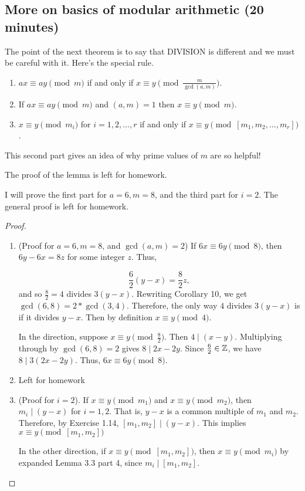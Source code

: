 \documentclass[letterpaper, 11 pt]{article}
\begin{document}
\subsection{More on basics of modular arithmetic (20 minutes)}
The point of the next theorem is to say that DIVISION is different and we must be careful with it. Here's the special rule.

\begin{thm}
\begin{enumerate}
\item $ax\equiv ay \pmod{m}$ if and only if $x\equiv y \pmod{\frac{m}{\gcd(a,m)}}$.
\item If $ax \equiv ay \pmod{m}$ and $(a,m)=1$ then $x\equiv y \pmod{m}$.
\item $x\equiv y \pmod{m_i}$ for $i=1,2,\dots, r$ if and only if $x\equiv y \pmod{[m_1,m_2,\dots,m_r]}$.
\end{enumerate}
\end{thm}

This second part gives an idea of why prime values of $m$ are so helpful!


The proof of the lemma is left for homework.

I will prove the first part for $a=6, m=8$, and the third part for $i=2$. The general proof is left for homework.
\begin{proof} 
\begin{enumerate}
 \item (Proof for $a=6, m=8$, and $\gcd(a,m)=2$) If $6x\equiv 6y \pmod 8$, then $6y-6x=8z$ for some integer $z$. Thus, 
 
 \[
\frac{6}{2}(y-x) = \frac{8}{2}z,
\]
and so $\frac{8}{2}=4$ divides $3 (y-x)$.  Rewriting Corollary 10, we get $\gcd(6,8)=2*\gcd(3,4)$.
 Therefore, the only way $4$ divides $3 (y-x)$ is if it divides $y-x$. Then by definition $x\equiv y \pmod{4}$.

In the direction, suppose $x\equiv y \pmod{\frac{8}{2}}$. Then $4\mid (x-y)$. Multiplying through by $\gcd(6,8)=2$ gives $8\mid 2x-2y$. Since $\frac{6}{2}\in\mathbb Z$, we have $8\mid 3(2x-2y)$. Thus, $6x\equiv 6y \pmod 8$.

\item Left for homework

\item (Proof for $i=2$). If $x\equiv y \pmod{m_1}$ and $x\equiv y \pmod{m_2}$, then $m_i\mid (y-x)$ for $i=1,2$. That is, $y-x$ is a common multiple of $m_1$ and $m_2$. Therefore, by Exercise 1.14, $[m_1,m_2]\mid (y-x)$. This implies $x\equiv y \pmod{[m_1,m_2]}$

In the other direction, if  $x\equiv y \pmod{[m_1,m_2]}$, then $x\equiv y \pmod{m_i}$ by expanded Lemma 3.3 part 4, since $m_i\mid [m_1,m_2]$. \qedhere
\end{enumerate}
\end{proof}
\end{document}
